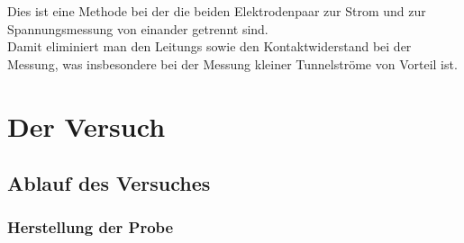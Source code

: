 \documentclass[twoside,        %
               BCOR12mm,       %
               english,ngerman, %
               fleqn,headsepline=false,footsepline=false
              ]{MFPREPORT}
\begin{document}
Dies ist eine Methode bei der die beiden Elektrodenpaar zur Strom und zur Spannungsmessung von einander getrennt sind.
\\
Damit eliminiert man den Leitungs sowie den Kontaktwiderstand bei der Messung, was insbesondere bei der Messung kleiner Tunnelströme von Vorteil ist.

\newpage

\section{Der Versuch}

\subsection{Ablauf des Versuches}


\subsubsection{Herstellung der Probe}
\end{document}
